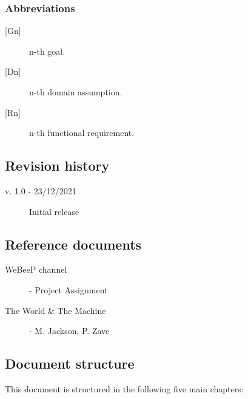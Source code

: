 \subsubsection{Abbreviations}

\begin{description}
    \item [{[Gn]}] n-th goal.
    \item [{[Dn]}] n-th domain assumption.
    \item [{[Rn]}] n-th functional requirement.
\end{description}

\bigskip
\subsection{Revision history}

\begin{description}
    \item[v. 1.0 - 23/12/2021] Initial release
\end{description} 

\bigskip
\subsection{Reference documents}

\begin{description}
    \item [WeBeeP channel] - Project Assignment
    \item [The World \& The Machine] - M. Jackson, P. Zave 
\end{description}

\bigskip
\subsection{Document structure}

This document is structured in the following five main chapters:

